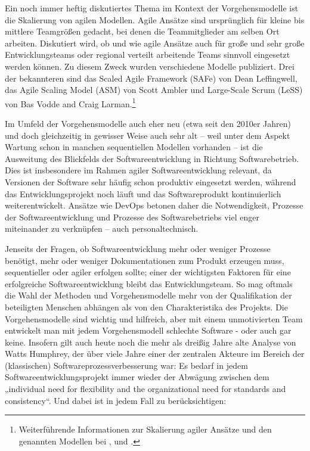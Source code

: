 Ein noch immer heftig diskutiertes Thema im Kontext der Vorgehensmodelle ist die Skalierung von agilen Modellen. Agile Ansätze sind ursprünglich für kleine bis mittlere Teamgrößen gedacht, bei denen die Teammitglieder am selben Ort arbeiten. Diskutiert wird, ob und wie agile Ansätze auch für große und sehr große Entwicklungsteams oder regional verteilt arbeitende Teams sinnvoll eingesetzt werden können. Zu diesem Zweck wurden verschiedene Modelle publiziert. Drei der bekannteren sind das Scaled Agile Framework (SAFe) von Dean Leffingwell, das Agile Scaling Model (ASM) von Scott Ambler und Large-Scale Scrum (LeSS) von Bas Vodde and Craig Larman.\footnote{Weiterführende Informationen zur Skalierung agiler Ansätze und den genannten Modellen bei \cite[104 \psqq]{som18}, \cite[95 \psqq]{kom20} und \cite[41 \psqq]{amb11}.}

Im Umfeld der Vorgehensmodelle auch eher neu (etwa seit den 2010er Jahren) und doch gleichzeitig in gewisser Weise auch sehr alt – weil unter dem Aspekt Wartung schon in manchen sequentiellen Modellen vorhanden – ist die Ausweitung des Blickfelds der Softwareentwicklung in Richtung Softwarebetrieb. Dies ist insbesondere im Rahmen agiler Softwareentwicklung relevant, da Versionen der Software sehr häufig schon produktiv eingesetzt werden, während das Entwicklungsprojekt noch läuft und das Softwareprodukt kontinuierlich weiterentwickelt. Ansätze wie DevOps  
betonen daher die Notwendigkeit, Prozesse der Softwareentwicklung und Prozesse des Softwarebetriebs viel enger miteinander zu verknüpfen – auch personaltechnisch. 

Jenseits der Fragen, ob Softwareentwicklung mehr oder weniger Prozesse benötigt, mehr oder weniger Dokumentationen zum Produkt erzeugen muss, sequentieller oder agiler erfolgen sollte; einer der wichtigsten Faktoren für eine erfolgreiche Software\-entwicklung bleibt das Entwicklungsteam. So mag oftmals die Wahl der Methoden und Vorgehensmodelle mehr von der Qualifikation der beteiligten Menschen abhängen als von den Charakteristika des Projekts. Die Vorgehensmodelle sind wichtig und hilfreich, aber mit einem unmotivierten Team entwickelt man mit jedem Vorgehensmodell schlechte Software - oder auch gar keine. Insofern gilt auch heute noch die mehr als dreißig Jahre alte Analyse von Watts Humphrey, der über viele Jahre einer der zentralen Akteure im Bereich der (klassischen) Software\-prozess\-verbesserung war: Es bedarf in jedem Softwareentwicklungsprojekt immer wieder der Abwägung zwischen dem „individual need for flexibility and the organizational need for standards and consistency“. Und dabei ist in jedem Fall zu berücksichtigen: 


